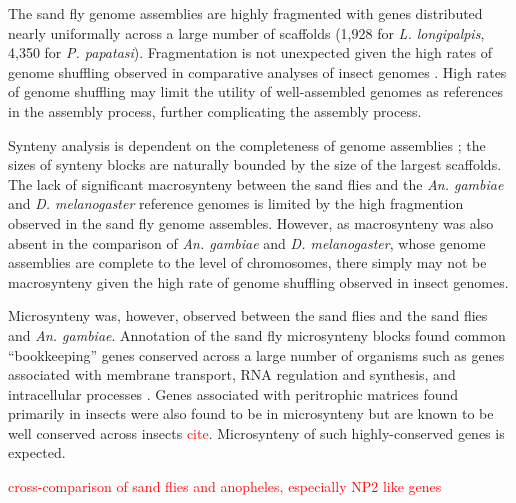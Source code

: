 The sand fly genome assemblies are highly fragmented with genes distributed nearly uniformally across a large number of scaffolds (1,928 for \emph{L. longipalpis}, 4,350 for \emph{P. papatasi}).  Fragmentation is not unexpected given the high rates of genome shuffling observed in comparative analyses of insect genomes \cite{Zdobnov2007,Ranz2001}.  High rates of genome shuffling may limit the utility of well-assembled genomes as references in the assembly process, further complicating the assembly process.

Synteny analysis is dependent on the completeness of genome assemblies \cite{Heger2007}; the sizes of synteny blocks are naturally bounded by the size of the largest scaffolds.  The lack of significant macrosynteny between the sand flies and the \emph{An. gambiae} and \emph{D. melanogaster} reference genomes is limited by the high fragmention observed in the sand fly genome assembles.  However, as macrosynteny was also absent in the comparison of \emph{An. gambiae} and \emph{D. melanogaster}, whose genome assemblies are complete to the level of chromosomes, there simply may not be macrosynteny given the high rate of genome shuffling observed in insect genomes.

Microsynteny was, however, observed between the sand flies and the sand flies and \emph{An. gambiae}.  Annotation of the sand fly microsynteny blocks found common ``bookkeeping'' genes conserved across a large number of organisms such as genes associated with membrane transport, RNA regulation and synthesis, and intracellular processes \cite{Zdobnov2007}.  Genes associated with peritrophic matrices found primarily in insects were also found to be in microsynteny but are known to be well conserved across insects \textcolor{red}{cite}.  Microsynteny of such highly-conserved genes is expected.

\textcolor{red}{cross-comparison of sand flies and anopheles, especially NP2 like genes}








